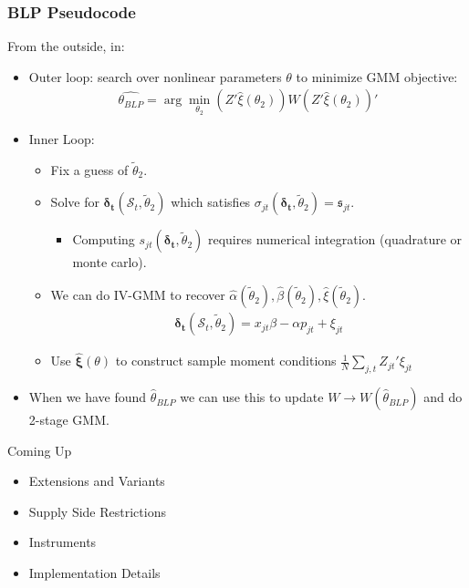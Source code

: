 \documentclass[xcolor=pdftex,dvipsnames,table,mathserif,aspectratio=169]{beamer}
\begin{document}
 \begin{frame}
\frametitle{BLP Pseudocode}
\footnotesize
From the outside, in:
\begin{itemize}
\item Outer loop: search over nonlinear parameters $\theta$ to minimize GMM objective:
 \begin{align*}
 \widehat{\theta_{BLP}} = \arg \min_{\theta_2} (Z' \hat{\xi}(\theta_2)) W  (Z' \hat{\xi}(\theta_2))'
 \end{align*}
 \item Inner Loop:
 \begin{itemize}
\item Fix a guess of $\widetilde{\theta}_2$.
\item Solve for $\boldsymbol{\delta_t}(\mathcal{S}_t,\widetilde{\theta}_2)$ which satisfies $\sigma_{jt}(\boldsymbol{\delta_t},\widetilde{\theta}_2) = \mathfrak{s}_{jt}$.
\begin{itemize}
\item Computing $s_{jt}(\boldsymbol{\delta_t},\widetilde{\theta}_2)$ requires numerical integration (quadrature or monte carlo).
\end{itemize}
 \item We can do IV-GMM to recover $\hat{\alpha}(\widetilde{\theta}_2),\hat{\beta}(\widetilde{\theta}_2),\hat{\xi}(\widetilde{\theta}_2)$.
  \begin{align*}
\boldsymbol{\delta_t}(\mathcal{S}_t,\widetilde{\theta}_2)= x_{jt} \beta -\alpha p_{jt}+  \xi_{jt}
 \end{align*}
  \item Use $\boldsymbol{\hat{\xi}}(\theta)$ to construct sample moment conditions $\frac{1}{N} \sum_{j,t} Z_{jt}' \xi_{jt}$
 \end{itemize}
 \item When we have found $\hat{\theta}_{BLP}$ we can use this to update $W \rightarrow W(\hat{\theta}_{BLP})$ and do 2-stage GMM.
 \end{itemize}
\end{frame}

\begin{frame}{Coming Up}
\begin{itemize}
\item Extensions and Variants
\item Supply Side Restrictions
\item Instruments
\item Implementation Details
\end{itemize}

\end{frame}
\end{document}
